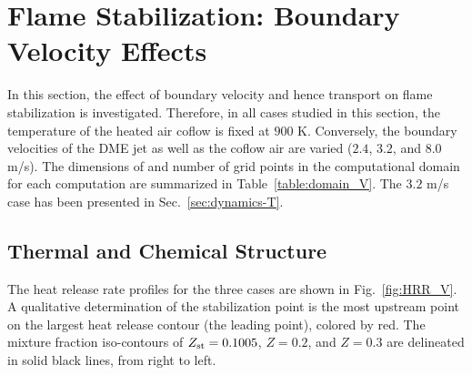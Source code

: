 \section{Flame Stabilization: Boundary Velocity Effects}\label{sec:dynamics-V}

In this section, the effect of boundary velocity and hence transport on flame stabilization is investigated.  Therefore, in all cases studied in this section, the temperature of the heated air coflow is fixed at $900$ K.  Conversely, the boundary velocities of the DME jet as well as the coflow air are varied ($2.4$, $3.2$, and $8.0$ m/s).  The dimensions of and number of grid points in the computational domain for each computation are summarized in Table~\ref{table:domain_V}.  The $3.2$ m/s case has been presented in Sec.~\ref{sec:dynamics-T}.

\begin{table}
  \caption{Computational domain and number of grid points for steady cases with the same boundary temperature but different flow velocities.}
  \label{table:domain_V}
  \centering
  \normalsize
\end{table}

\subsection{Thermal and Chemical Structure} \label{sec:dynamcis-structure_V}

The heat release rate profiles for the three cases are shown in Fig.~\ref{fig:HRR_V}.  A qualitative determination of the stabilization point is the most upstream point on the largest heat release contour (the leading point), colored by red.  The mixture fraction iso-contours of $Z_{\rm st} = 0.1005$, $Z = 0.2$, and $Z = 0.3$ are delineated in solid black lines, from right to left.

